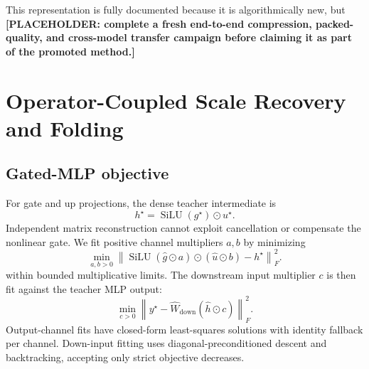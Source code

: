 \documentclass[10pt]{article}
\newcommand{\placeholder}[1]{\textcolor{red!70!black}{\textbf{[PLACEHOLDER: #1]}}}
\begin{document}
\begin{center}
\end{center}

This representation is fully documented because it is algorithmically new,
but \placeholder{complete a fresh end-to-end compression, packed-quality, and
cross-model transfer campaign before claiming it as part of the promoted
method.}

\section{Operator-Coupled Scale Recovery and Folding}

\subsection{Gated-MLP objective}

For gate and up projections, the dense teacher intermediate is
\[
 h^\star=\operatorname{SiLU}(g^\star)\odot u^\star.
 \tag{9}
\]
Independent matrix reconstruction cannot exploit cancellation or compensate
the nonlinear gate. We fit positive channel multipliers $a,b$ by minimizing
\[
 \min_{a,b>0}\left\|
 \operatorname{SiLU}(\widehat g\odot a)\odot(\widehat u\odot b)-h^\star
 \right\|_F^2.
 \tag{10}
\]
within bounded multiplicative limits. The downstream input multiplier $c$ is
then fit against the teacher MLP output:
\[
 \min_{c>0}\left\|y^\star-\widehat W_{\mathrm{down}}
       (\widehat h\odot c)\right\|_F^2.
 \tag{11}
\]
Output-channel fits have closed-form least-squares solutions with identity
fallback per channel. Down-input fitting uses diagonal-preconditioned descent
and backtracking, accepting only strict objective decreases.
\end{document}
